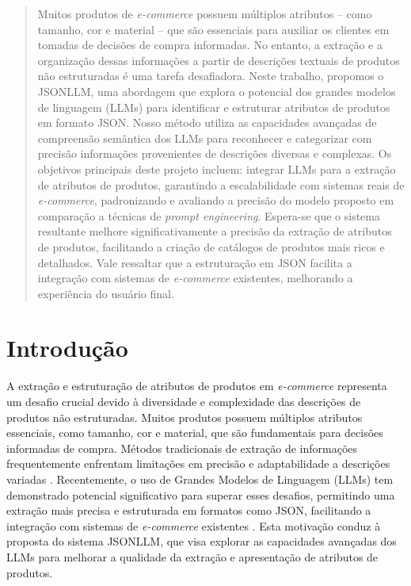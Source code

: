 




\maketitle

\begin{abstract} %
    Muitos produtos de \textit{e-commerce} possuem múltiplos atributos -- como tamanho, cor e material -- que são essenciais para auxiliar os clientes em tomadas de decisões de compra informadas. No entanto, a extração e a organização dessas informações a partir de descrições textuais de produtos não estruturadas é uma tarefa desafiadora.
    Neste trabalho, propomos o JSONLLM, uma abordagem que explora o potencial dos grandes modelos de linguagem (LLMs) para identificar e estruturar atributos de produtos em formato JSON. Nosso método utiliza as capacidades avançadas de compreensão semântica dos LLMs para reconhecer e categorizar com precisão informações provenientes de descrições diversas e complexas.
    Os objetivos principais deste projeto incluem: integrar LLMs para a extração de atributos de produtos, garantindo a escalabilidade com sistemas reais de \textit{e-commerce}, padronizando e avaliando a precisão do modelo proposto em comparação a técnicas de \textit{prompt engineering}.
    Espera-se que o sistema resultante melhore significativamente a precisão da extração de atributos de produtos, facilitando a criação de catálogos de produtos mais ricos e detalhados. Vale ressaltar que a estruturação em JSON facilita a integração com sistemas de \textit{e-commerce} existentes, melhorando a experiência do usuário final.
\end{abstract}

\section{Introdução} %

A extração e estruturação de atributos de produtos em \textit{e-commerce} representa um desafio crucial devido à diversidade e complexidade das descrições de produtos não estruturadas. Muitos produtos possuem múltiplos atributos essenciais, como tamanho, cor e material, que são fundamentais para decisões informadas de compra. Métodos tradicionais de extração de informações frequentemente enfrentam limitações em precisão e adaptabilidade a descrições variadas \citet{ExtractGPT2023}. Recentemente, o uso de Grandes Modelos de Linguagem (LLMs) tem demonstrado potencial significativo para superar esses desafios, permitindo uma extração mais precisa e estruturada em formatos como JSON, facilitando a integração com sistemas de \textit{e-commerce} existentes \citet{PAE2024}. Esta motivação conduz à proposta do sistema JSONLLM, que visa explorar as capacidades avançadas dos LLMs para melhorar a qualidade da extração e apresentação de atributos de produtos.

